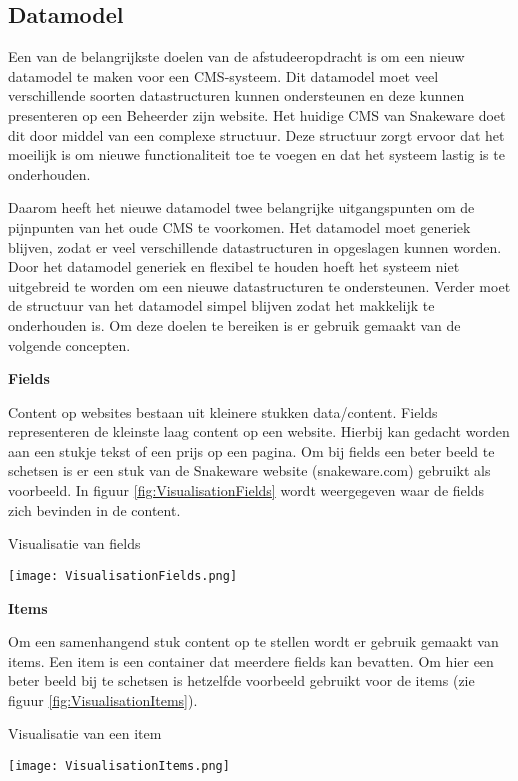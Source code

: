 \subsection{Datamodel}
\label{subsection:Datamodel}
Een van de belangrijkste doelen van de afstudeeropdracht is om een nieuw datamodel te maken voor een CMS-systeem.
Dit datamodel moet veel verschillende soorten datastructuren kunnen ondersteunen en deze kunnen presenteren op een \gls{Beheerder} zijn website.
Het huidige CMS van Snakeware doet dit door middel van een complexe structuur.
Deze structuur zorgt ervoor dat het moeilijk is om nieuwe functionaliteit toe te voegen en dat het systeem lastig is te onderhouden.

\whitespace
Daarom heeft het nieuwe datamodel twee belangrijke uitgangspunten om de pijnpunten van het oude CMS te voorkomen.
Het datamodel moet generiek blijven, zodat er veel verschillende datastructuren in opgeslagen kunnen worden.
Door het datamodel generiek en flexibel te houden hoeft het systeem niet uitgebreid te worden om een nieuwe datastructuren te ondersteunen.
Verder moet de structuur van het datamodel simpel blijven zodat het makkelijk te onderhouden is.
Om deze doelen te bereiken is er gebruik gemaakt van de volgende concepten.

\whitespace
\textbf{Fields}

\whitespace
Content op websites bestaan uit kleinere stukken data\slash content.
Fields representeren de kleinste laag content op een website. 
Hierbij kan gedacht worden aan een stukje tekst of een prijs op een pagina.
Om bij fields een beter beeld te schetsen is er een stuk van de Snakeware website (snakeware.com) gebruikt als voorbeeld.
In figuur \ref{fig:VisualisationFields} wordt weergegeven waar de fields zich bevinden in de content.

\whitespace[2]
\begin{graphic}
    \captionsetup{type=figure}
    \caption{Visualisatie van fields}
    \texttt{[image: VisualisationFields.png]}
    \label{fig:VisualisationFields}
\end{graphic}

\whitespace
\textbf{Items}

\whitespace
Om een samenhangend stuk content op te stellen wordt er gebruik gemaakt van items.
Een item is een container dat meerdere fields kan bevatten.
Om hier een beter beeld bij te schetsen is hetzelfde voorbeeld gebruikt voor de items (zie figuur \ref{fig:VisualisationItems}).

\whitespace[2]
\begin{graphic}
    \captionsetup{type=figure}
    \caption{Visualisatie van een item}
    \texttt{[image: VisualisationItems.png]}
    \label{fig:VisualisationItems}
\end{graphic}

